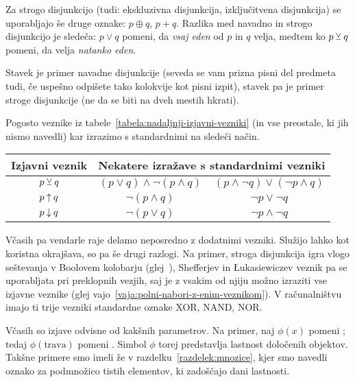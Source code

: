 Za strogo disjunkcijo (tudi: ekskluzivna disjunkcija, izključitvena disjunkcija) se uporabljajo še druge oznake: $p \oplus q$, $p + q$. Razlika med navadno in strogo disjunkcijo je sledeča: $p \lor q$ pomeni, da \emph{vsaj eden} od $p$ in $q$ velja, medtem ko $p \mathbin{\veebar} q$ pomeni, da velja \emph{natanko eden}.

\begin{zgled}
Stavek  je primer navadne disjunkcije (seveda se vam prizna pisni del predmeta tudi, če uspešno odpišete tako kolokvije kot pisni izpit), stavek  pa je primer stroge disjunkcije (ne da se biti na dveh mestih hkrati).
\end{zgled}

Pogosto veznike iz tabele~\ref{tabela:nadaljnji-izjavni-vezniki} (in vse preostale, ki jih nismo navedli) kar izrazimo s standardnimi na sledeči način.
\begin{center}
\begin{tabular}{|ccc|}
\hline
\textbf{Izjavni veznik} & \multicolumn{2}{c|}{\textbf{Nekatere izražave s standardnimi vezniki}} \\
\hline
$p \mathbin{\veebar} q$ & $(p \lor q) \land \lnot(p \land q)$ & $(p \land \lnot{q}) \lor (\lnot{p} \land q)$ \\
$p \mathbin{\uparrow} q$ & $\lnot(p \land q)$ & $\lnot{p} \lor \lnot{q}$ \\
$p \mathbin{\downarrow} q$ & $\lnot(p \lor q)$ & $\lnot{p} \land \lnot{q}$ \\
\hline
\end{tabular}
\end{center}

Včasih pa vendarle raje delamo neposredno z dodatnimi vezniki. Služijo lahko kot koristna okrajšava, so pa še drugi razlogi. Na primer, stroga disjunkcija igra vlogo seštevanja v Boolovem kolobarju (glej~), Shefferjev in Łukasiewiczev veznik pa se uporabljata pri preklopnih vezjih, saj je z vsakim od njiju možno izraziti vse izjavne veznike (glej vajo~\ref{vaja:polni-nabori-z-enim-veznikom}). V računalništvu imajo ti trije vezniki standardne oznake XOR, NAND, NOR.


Včasih so izjave odvisne od kakšnih parametrov. Na primer, naj $\phi(x)$ pomeni ; tedaj $\phi(\text{trava})$ pomeni . Simbol $\phi$ torej predstavlja lastnost določenih objektov. Takšne primere smo imeli že v razdelku~\ref{razdelek:mnozice}, kjer smo navedli oznako za podmnožico tistih elementov, ki zadoščajo dani lastnosti.

